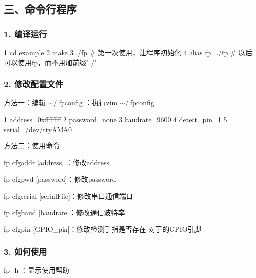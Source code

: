 \subsection*{三、命令行程序}

\subsubsection*{1. 编译运行}


\begin{DoxyCode}
1 cd example
2 make
3 ./fp  # 第一次使用，让程序初始化
4 alias fp=./fp # 以后可以使用fp，而不用加前缀"./"
\end{DoxyCode}


\subsubsection*{2. 修改配置文件}

方法一：编辑 {\ttfamily $\sim$/.fpconfig} ：执行{\ttfamily vim $\sim$/.fpconfig}


\begin{DoxyCode}
1 address=0xffffffff
2 password=none
3 baudrate=9600
4 detect\_pin=1
5 serial=/dev/ttyAMA0
\end{DoxyCode}


方法二：使用命令


\begin{DoxyItemize}
\item {\ttfamily fp cfgaddr \mbox{[}address\mbox{]}} ：修改address
\item {\ttfamily fp cfgpwd \mbox{[}password\mbox{]}}：修改password
\item {\ttfamily fp cfgserial \mbox{[}serial\+File\mbox{]}}：修改串口通信端口
\item {\ttfamily fp cfgbaud \mbox{[}baudrate\mbox{]}}：修改通信波特率
\item {\ttfamily fp cfgpin \mbox{[}G\+P\+I\+O\+\_\+pin\mbox{]}}：修改检测手指是否存在 对于的\+G\+P\+I\+O引脚
\end{DoxyItemize}

\subsubsection*{3. 如何使用}

{\ttfamily fp -\/h} ：显示使用帮助



